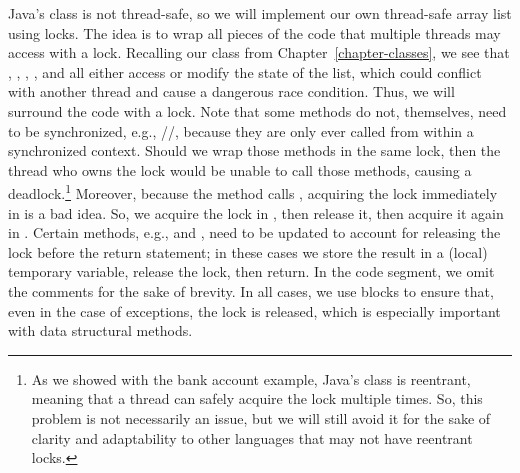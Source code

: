 Java's  class is not thread-safe, so we will implement our own thread-safe array list using locks. 
The idea is to wrap all pieces of the code that multiple threads may access with a lock. 
Recalling our  class from Chapter~\ref{chapter-classes}, we see that , , , , and  all either access or modify the state of the list, which could conflict with another thread and cause a dangerous race condition. 
Thus, we will surround the code with a lock. 
Note that some methods do not, themselves, need to be synchronized, e.g., //, because they are only ever called from within a synchronized context. 
Should we wrap those methods in the same lock, then the thread who owns the lock would be unable to call those methods, causing a deadlock.\footnote{As we showed with the bank account example, Java's  class is reentrant, meaning that a thread can safely acquire the lock multiple times. So, this problem is not necessarily an issue, but we will still avoid it for the sake of clarity and adaptability to other languages that may not have reentrant locks.} 
Moreover, because the  method calls , acquiring the lock immediately in  is a bad idea. 
So, we acquire the lock in , then release it, then acquire it again in . 
Certain methods, e.g.,  and , need to be updated to account for releasing the lock before the return statement; in these cases we store the result in a (local) temporary variable, release the lock, then return. 
In the code segment, we omit the comments for the sake of brevity. 
In all cases, we use  blocks to ensure that, even in the case of exceptions, the lock is released, which is especially important with data structural methods.

